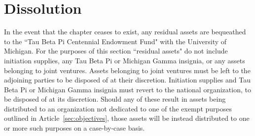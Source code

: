 \chapter{Dissolution}\label{sec:dissolution}
In the event that the chapter ceases to exist, any residual assets are bequeathed to the ``Tau Beta Pi Centennial Endowment Fund" with the University of Michigan.
For the purposes of this section ``residual assets" do not include initiation supplies, any Tau Beta Pi or Michigan Gamma insignia, or any assets belonging to joint ventures.
Assets belonging to joint ventures must be left to the adjoining parties to be disposed of at their discretion.
Initiation supplies and Tau Beta Pi or Michigan Gamma insignia must revert to the national organization, to be disposed of at its discretion.
Should any of these result in assets being distributed to an organization not dedicated to one of the exempt purposes outlined in Article~\ref{sec:objectives}, those assets will be instead distributed to one or more such purposes on a case-by-case basis.